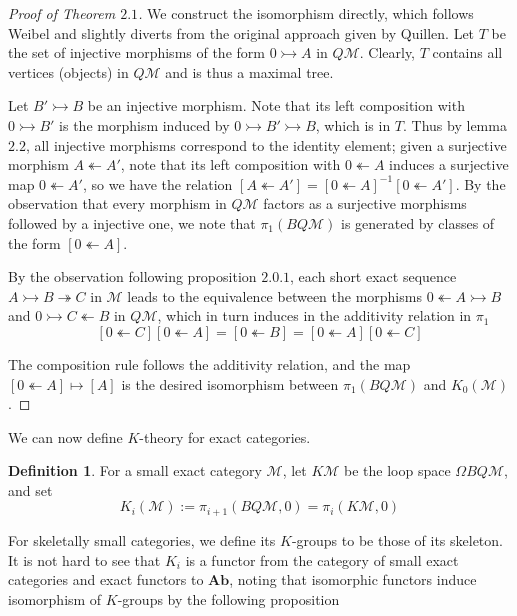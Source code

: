 \documentclass{article}
\theoremstyle{definition}
\theoremstyle{definition}
\newtheorem{definition}{Definition}[theorem]
\theoremstyle{definition}
\theoremstyle{definition}
\theoremstyle{definition}
\theoremstyle{definition}
\theoremstyle{definition}
\begin{document}
\begin{proof}[Proof of Theorem $2.1$]
    We construct the isomorphism directly, which follows Weibel and slightly diverts from the original approach given by Quillen. Let $T$ be the set of injective morphisms of the form $0\rightarrowtail A$ in $Q\mathcal{M}$. Clearly, $T$ contains all vertices (objects) in $Q\mathcal{M}$ and is thus a maximal tree. 

    
    
    Let $B'\rightarrowtail B$ be an injective morphism. Note that its left composition with $0\rightarrowtail B'$ is the morphism induced by $0\rightarrowtail B'\rightarrowtail B$, which is in $T$. Thus by lemma $2.2$, all injective morphisms correspond to the identity element; given a surjective morphism $A\twoheadleftarrow A'$, note that its left composition with $0 \twoheadleftarrow A$ induces a surjective map $0\twoheadleftarrow A'$, so we have the relation $[A\twoheadleftarrow A']=[0\twoheadleftarrow A]^{-1}[0\twoheadleftarrow A']$. By the observation that every morphism in $Q\mathcal{M}$ factors as a surjective morphisms followed by a injective one, we note that $\pi_1(BQ\mathcal{M})$ is generated by classes of the form $[0\twoheadleftarrow A]$.

    By the observation following proposition $2.0.1$, each short exact sequence $A\rightarrowtail B\twoheadrightarrow C$ in $\mathcal{M}$ leads to the equivalence between the morphisms $0\twoheadleftarrow A\rightarrowtail B$ and $0 \rightarrowtail C\twoheadleftarrow B $ in $Q\mathcal{M}$, which in turn induces in the additivity relation in $\pi_1$
    \[[0\twoheadleftarrow C][0\twoheadleftarrow A]=[0\twoheadleftarrow B]=[0\twoheadleftarrow A][0\twoheadleftarrow C]\]

    The composition rule follows the additivity relation, and the map $[0\twoheadleftarrow A]\mapsto [A]$ is the desired isomorphism between $\pi_1(BQ\mathcal{M})$ and $K_0(\mathcal{M})$.
\end{proof}


We can now define $K$-theory for exact categories.


\begin{tcolorbox}[colback=purple!5!white,colframe=purple!75!black]
\begin{definition}
For a small exact category $\mathcal{M}$, let $K\mathcal{M}$ be the loop space $\Omega BQ\mathcal{M}$, and set
\[K_i(\mathcal{M}):=\pi_{i+1}(BQ\mathcal{M},0)=\pi_i(K\mathcal{M},0)\]
\end{definition}
\end{tcolorbox}
For skeletally small categories, we define its $K$-groups to be those of its skeleton. It is not hard to see that $K_i$ is a functor from the category of small exact categories and exact functors to $\textbf{Ab}$, noting that isomorphic functors induce isomorphism of $K$-groups by the following proposition
\end{document}
